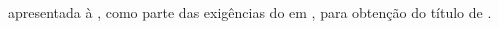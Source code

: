 
   \thispagestyle{empty}
   \setcounter{page}{0}
\begin{spacing}{1}
	\begin{center}
		\vspace*{-0.5cm}
		{\MakeUppercase{\nome} \\ }
		
		
		\vspace*{8cm}
		{\MakeUppercase{\textbf{\titulo}} \\ }
	\end{center}
	\vspace*{4cm}
	\singlespacing
	\begin{flushright}
		\begin{minipage}{7.5cm}
			{\tipo apresentada à \instituicao, como parte
				das exigências do \curso em \programa, para
				obtenção do título de \textit{\titulop}.}
		\end{minipage}
	\end{flushright}
	\vfill
	
	\begin{center}
	\MakeUppercase{\cidade}
	
	\MakeUppercase{\estado}
	
	\MakeUppercase{\ano}
	
	
	\end{center}
	
\end{spacing}